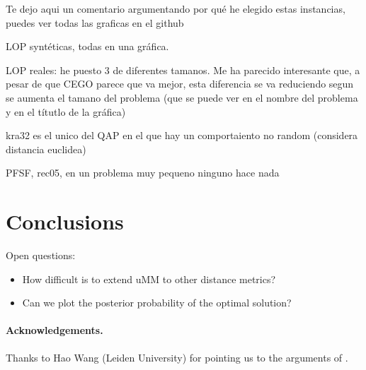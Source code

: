 \documentclass[runningheads]{llncs}
\begin{document}
Te dejo aqui un comentario argumentando por qué he elegido estas instancias, puedes ver todas las graficas en el github

LOP syntéticas, todas en una gráfica. 

LOP reales: he puesto 3 de diferentes tamanos. Me ha parecido interesante que, a pesar de que CEGO parece que va mejor, esta diferencia se va reduciendo segun se aumenta el tamano del problema (que se puede ver en el nombre del problema y en el títutlo de la gráfica)

kra32 es el unico del QAP en el que hay un comportaiento no random (considera distancia euclidea)

PFSF, rec05, en un problema muy pequeno ninguno hace nada

\section{Conclusions}

Open questions:
\begin{itemize}
\item How difficult is to extend uMM to other distance metrics?
\item Can we plot the posterior probability of the optimal solution?
\end{itemize}

\paragraph*{Acknowledgements.}

Thanks to Hao Wang (Leiden University) for pointing us to the arguments of
\citet{EriPeaGar2019scalable}.




\renewcommand{\doi}[1]{doi:\hspace{.16667em plus .08333em}\discretionary{}{}{}\href{https://doi.org/#1}{\urlstyle{rm}\nolinkurl{#1}}}


\end{document}
